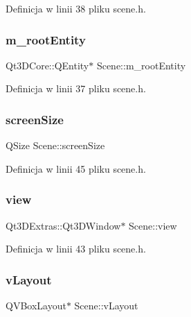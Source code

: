 Definicja w linii 38 pliku scene.\+h.

\mbox{\label{class_scene_a1ef7f61aed73e150dfb7ef7ffc47f7c2}} 
\subsubsection{\texorpdfstring{m\+\_\+root\+Entity}{m\_rootEntity}}
{\footnotesize\ttfamily Qt3\+D\+Core\+::\+Q\+Entity$\ast$ Scene\+::m\+\_\+root\+Entity}



Definicja w linii 37 pliku scene.\+h.

\mbox{\label{class_scene_a2bb58c1253bd4d64781a2b9e25604060}} 
\subsubsection{\texorpdfstring{screen\+Size}{screenSize}}
{\footnotesize\ttfamily Q\+Size Scene\+::screen\+Size}



Definicja w linii 45 pliku scene.\+h.

\mbox{\label{class_scene_a3b76fefe111a22aa56f066783fa76bc1}} 
\subsubsection{\texorpdfstring{view}{view}}
{\footnotesize\ttfamily Qt3\+D\+Extras\+::\+Qt3\+D\+Window$\ast$ Scene\+::view}



Definicja w linii 43 pliku scene.\+h.

\mbox{\label{class_scene_adae30f81725ed3f2258bee8fe5e90c5d}} 
\subsubsection{\texorpdfstring{v\+Layout}{vLayout}}
{\footnotesize\ttfamily Q\+V\+Box\+Layout$\ast$ Scene\+::v\+Layout}



